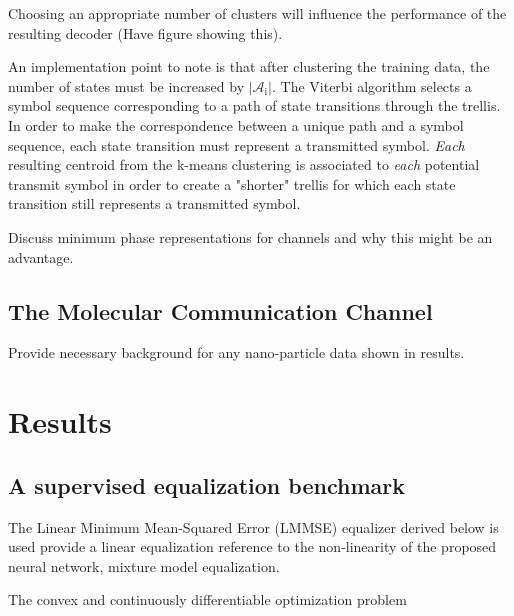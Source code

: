 \documentclass[12pt,a4paper]{article}
\begin{document}
Choosing an appropriate number of clusters will influence the performance of the resulting decoder (Have figure showing this).
\par An implementation point to note is that after clustering the training data, the number of states must be increased by $|\mathcal{A}_{\mathrm{i}}|$. The Viterbi algorithm selects a symbol sequence corresponding to a path of state transitions through the trellis. In order to make the correspondence between a unique path and a symbol sequence, each state transition must represent a transmitted symbol. \emph{Each} resulting centroid from the k-means clustering is associated to \emph{each} potential transmit symbol in order to create a "shorter" trellis for which each state transition still represents a transmitted symbol. 

Discuss minimum phase representations for channels and why this might be an advantage. 

\subsection{The Molecular Communication Channel}
Provide necessary background for any nano-particle data shown in results. 



\section{Results}
\subsection{A supervised equalization benchmark}
The Linear Minimum Mean-Squared Error (LMMSE) equalizer derived below is used provide a linear equalization reference to the non-linearity of the proposed neural network, mixture model equalization.
\par
The convex and continuously differentiable optimization problem 
\end{document}
